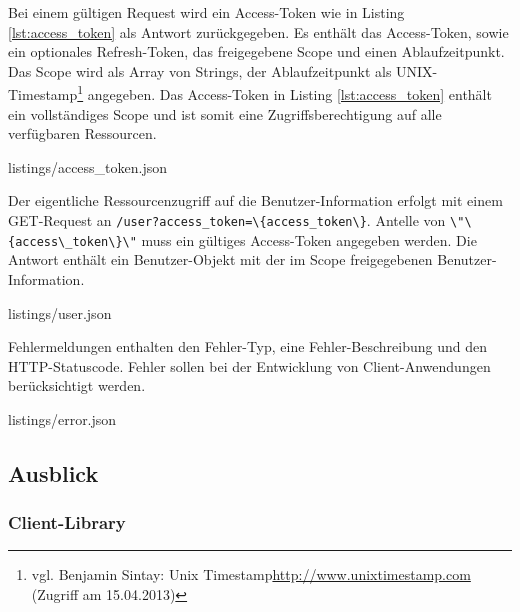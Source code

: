 \documentclass[12pt,a4paper,pointednumbers,abstracton]{scrartcl}
\newcommand{\code}[1]{\small\lstinline[style=InlinePHP]!#1!\normalsize}
\begin{document}
Bei einem gültigen Request wird ein Access-Token wie in Listing \ref{lst:access_token} als Antwort zurückgegeben.
Es enthält das Access-Token, sowie ein optionales Refresh-Token, das freigegebene Scope und einen Ablaufzeitpunkt.
Das Scope wird als Array von Strings, der Ablaufzeitpunkt als UNIX-Timestamp\footnote{vgl. Benjamin Sintay: Unix Timestamp\url{http://www.unixtimestamp.com} (Zugriff am 15.04.2013)} angegeben.
Das Access-Token in Listing \ref{lst:access_token} enthält ein vollständiges Scope und ist somit eine Zugriffsberechtigung auf alle verfügbaren Ressourcen.

\begin{minipage}{\textwidth}
	
	{listings/access_token.json}
\end{minipage}

Der eigentliche Ressourcenzugriff auf die Benutzer-Information erfolgt mit einem GET-Request an \code{/user?access_token=\{access_token\}}.
Antelle von \code{\"\{access\_token\}\"} muss ein gültiges Access-Token angegeben werden.
Die Antwort enthält ein Benutzer-Objekt mit der im Scope freigegebenen Benutzer-Information.

\begin{minipage}{\textwidth}
	
	{listings/user.json}
\end{minipage}

Fehlermeldungen enthalten den Fehler-Typ, eine Fehler-Beschreibung und den HTTP-Statuscode.
Fehler sollen bei der Entwicklung von Client-Anwendungen berücksichtigt werden.

\begin{minipage}{\textwidth}
	
	{listings/error.json}
\end{minipage}

\subsection{Ausblick}

\subsubsection{Client-Library}
\end{document}
